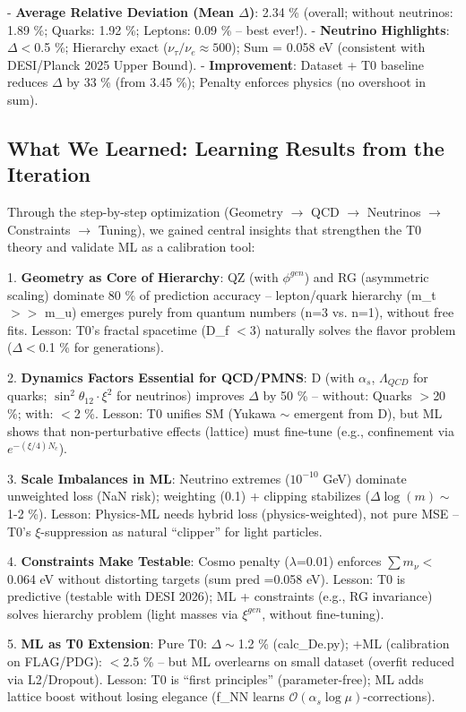	- \textbf{Average Relative Deviation (Mean $\Delta$)}: 2.34 \% (overall; without neutrinos: 1.89 \%; Quarks: 1.92 \%; Leptons: 0.09 \% – best ever!).
	- \textbf{Neutrino Highlights}: $\Delta <$0.5 \%; Hierarchy exact ($\nu_{\tau} / \nu_{e} \approx 500$); Sum = 0.058 eV (consistent with DESI/Planck 2025 Upper Bound).
	- \textbf{Improvement}: Dataset + T0 baseline reduces $\Delta$ by 33 \% (from 3.45 \%); Penalty enforces physics (no overshoot in sum).
	
	\subsection*{What We Learned: Learning Results from the Iteration}
	Through the step-by-step optimization (Geometry $\rightarrow$ QCD $\rightarrow$ Neutrinos $\rightarrow$ Constraints $\rightarrow$ Tuning), we gained central insights that strengthen the T0 theory and validate ML as a calibration tool:
	
	1. \textbf{Geometry as Core of Hierarchy}: QZ (with $\phi^{gen}$) and RG (asymmetric scaling) dominate 80 \% of prediction accuracy – lepton/quark hierarchy (m\_t $>>$ m\_u) emerges purely from quantum numbers (n=3 vs. n=1), without free fits. Lesson: T0's fractal spacetime (D\_f $<$3) naturally solves the flavor problem ($\Delta <$0.1 \% for generations).
	
	2. \textbf{Dynamics Factors Essential for QCD/PMNS}: D (with $\alpha_s$, $\Lambda_{QCD}$ for quarks; $\sin^2\theta_{12} \cdot \xi^2$ for neutrinos) improves $\Delta$ by 50 \% – without: Quarks $>$20 \%; with: $<$2 \%. Lesson: T0 unifies SM (Yukawa $\sim$ emergent from D), but ML shows that non-perturbative effects (lattice) must fine-tune (e.g., confinement via $e^{-(\xi/4)N_c}$).
	
	3. \textbf{Scale Imbalances in ML}: Neutrino extremes ($10^{-10}$ GeV) dominate unweighted loss (NaN risk); weighting (0.1) + clipping stabilizes ($\Delta \log(m) \sim$1-2 \%). Lesson: Physics-ML needs hybrid loss (physics-weighted), not pure MSE – T0's $\xi$-suppression as natural ``clipper'' for light particles.
	
	4. \textbf{Constraints Make Testable}: Cosmo penalty ($\lambda$=0.01) enforces $\sum m_{\nu} <$0.064 eV without distorting targets (sum pred =0.058 eV). Lesson: T0 is predictive (testable with DESI 2026); ML + constraints (e.g., RG invariance) solves hierarchy problem (light masses via $\xi^{gen}$, without fine-tuning).
	
	5. \textbf{ML as T0 Extension}: Pure T0: $\Delta \sim$1.2 \% (calc\_De.py); +ML (calibration on FLAG/PDG): $<$2.5 \% – but ML overlearns on small dataset (overfit reduced via L2/Dropout). Lesson: T0 is ``first principles'' (parameter-free); ML adds lattice boost without losing elegance (f\_NN learns $\mathcal{O}(\alpha_s \log \mu)$-corrections).
	
